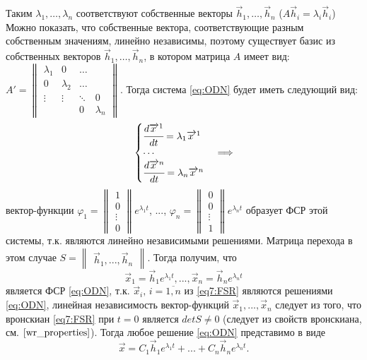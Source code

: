 Таким $\lambda_1, \dots, \lambda_n$ соответствуют собственные векторы $\overrightarrow{h}_1, \dots, \overrightarrow{h}_n$ ($A \overrightarrow{h}_i = \lambda_i \overrightarrow{h}_i$)
Можно показать, что собственные вектора, соответствующие разным собственным значениям, линейно независимы, 
поэтому существует базис из собственных векторов $\overrightarrow{h}_1, \dots, \overrightarrow{h}_n$, в котором матрица $A$ имеет вид: 
$A' = \begin{Vmatrix} \lambda_1 & 0 & \ldots & \\ 0 & \lambda_2 & \ldots \\  \vdots& \vdots & \ddots &  0 \\ & & 0 & \lambda_n \end{Vmatrix}$.
Тогда система \eqref{eq:ODN} будет иметь следующий вид: 
\[ \begin{cases}
    \cfrac{d \overrightarrow{x\,}^1}{dt} = \lambda_1 \overrightarrow{x \,}^1 \\
    \cdots \\
    \cfrac{d \overrightarrow{x \,}^n}{dt} = \lambda_n \overrightarrow{x \,}^n
\end{cases} \Longrightarrow \]
вектор-функции $\varphi_1 = \begin{Vmatrix*} 1 \\ 0 \\ \vdots \\ 0 \end{Vmatrix*} e^{\lambda_1 t}$, ..., 
$\varphi_n = \begin{Vmatrix*} 0 \\ 0 \\ \vdots \\ 1 \end{Vmatrix*} e^{\lambda_n t}$ 
образует ФСР этой системы, т.к. являются линейно независимыми решениями.
Матрица перехода в этом случае $S = \begin{Vmatrix*} \overrightarrow{h}_1,  ...,  \overrightarrow{h}_n \end{Vmatrix*}$. 
Тогда получим, что
\begin{equation}
  \overrightarrow{x}_1 = \overrightarrow{h}_1 e^{\lambda_1 t}, ..., \overrightarrow{x}_n = \overrightarrow{h}_n e^{\lambda_n t} \label{eq7:FSR}
\end{equation} является ФСР \eqref{eq:ODN}, т.к. $\overrightarrow{x}_i, \,i= \overline{1, n}$ из \eqref{eq7:FSR} являются решениями \eqref{eq:ODN}, 
линейная независимость вектор-функций $\overrightarrow{x}_1, ..., \overrightarrow{x}_n$ следует из того, что вронскиан \eqref{eq7:FSR} при $t=0$ является $det S \neq 0$ (следует из свойств вронскиана, см. $\eqref{wr_properties}$).
Тогда любое решение \eqref{eq:ODN} представимо в виде
\begin{equation}
  \overrightarrow{x} = C_1 \overrightarrow{h}_1 e^{\lambda_1 t} + ... + C_n \overrightarrow{h}_n e^{\lambda_n t}.
\end{equation}

